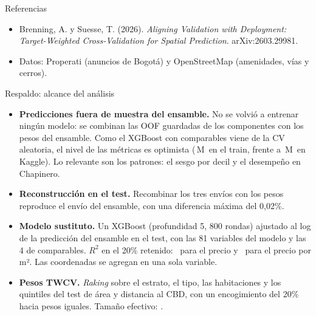 \documentclass[aspectratio=169,10pt]{beamer}
\newcommand{\M}{\,M}   %
\begin{document}
\begin{frame}{Referencias}
  \small
  \begin{itemize}\setlength{\itemsep}{.5em}
    \item Brenning, A. y Suesse, T. (2026). \emph{Aligning Validation with Deployment: Target-Weighted Cross-Validation for Spatial Prediction}. arXiv:2603.29981.
    \item Datos: Properati (anuncios de Bogotá) y OpenStreetMap (amenidades, vías y cerros).
  \end{itemize}
\end{frame}

\appendix
\begin{frame}{Respaldo: alcance del análisis}
  \small
  \begin{itemize}\setlength{\itemsep}{.4em}
    \item \textbf{Predicciones fuera de muestra del ensamble.} No se volvió a entrenar ningún modelo: se combinan las OOF guardadas de los componentes con los pesos del ensamble. Como el XGBoost con comparables viene de la CV aleatoria, el nivel de las métricas es optimista (\maeOOF\M\ en el train, frente a \kPub\M\ en Kaggle). Lo relevante son los patrones: el sesgo por decil y el desempeño en Chapinero.
    \item \textbf{Reconstrucción en el test.} Recombinar los tres envíos con los pesos reproduce el envío del ensamble, con una diferencia máxima del 0,02\%.
    \item \textbf{Modelo sustituto.} Un XGBoost (profundidad 5, 800 rondas) ajustado al log de la predicción del ensamble en el test, con las 81 variables del modelo y las 4 de comparables. $R^2$ en el 20\% retenido: \rDosSust\ para el precio y \rDosSustM\ para el precio por m². Las coordenadas se agregan en una sola variable.
    \item \textbf{Pesos TWCV.} \emph{Raking} sobre el estrato, el tipo, las habitaciones y los quintiles del test de área y distancia al CBD, con un encogimiento del 20\% hacia pesos iguales. Tamaño efectivo: \essTWCV.
  \end{itemize}
\end{frame}
\end{document}
